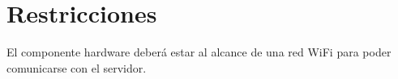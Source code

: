 \section{Restricciones}

El componente hardware deberá estar al alcance de una red WiFi para poder comunicarse con el servidor.